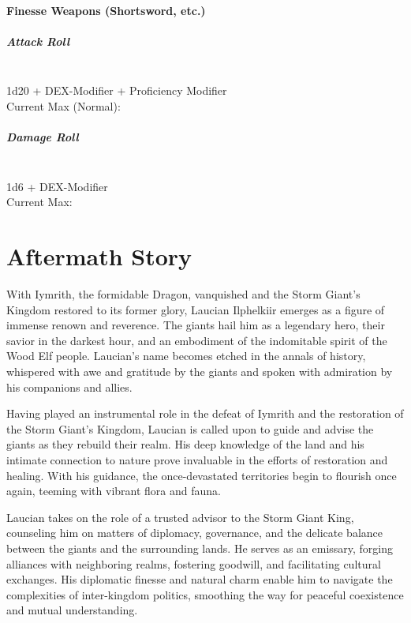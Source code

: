 \documentclass[letterpaper,openany,oneside,twocolumn]{book}
\begin{document}
\subsubsection*{Finesse Weapons (Shortsword, etc.)}
\paragraph*{Attack Roll}\hfill\\
1d20 + DEX-Modifier + Proficiency Modifier \\
\indent Current Max (Normal): 
\paragraph*{Damage Roll}\hfill\\
1d6 + DEX-Modifier \\
\indent Current Max: 

\chapter*{Aftermath Story}

\entryfont With Iymrith, the formidable Dragon, vanquished and the Storm Giant's Kingdom restored to its former glory, Laucian Ilphelkiir emerges as a figure of immense renown and reverence. The giants hail him as a legendary hero, their savior in the darkest hour, and an embodiment of the indomitable spirit of the Wood Elf people. Laucian's name becomes etched in the annals of history, whispered with awe and gratitude by the giants and spoken with admiration by his companions and allies.

Having played an instrumental role in the defeat of Iymrith and the restoration of the Storm Giant's Kingdom, Laucian is called upon to guide and advise the giants as they rebuild their realm. His deep knowledge of the land and his intimate connection to nature prove invaluable in the efforts of restoration and healing. With his guidance, the once-devastated territories begin to flourish once again, teeming with vibrant flora and fauna.

Laucian takes on the role of a trusted advisor to the Storm Giant King, counseling him on matters of diplomacy, governance, and the delicate balance between the giants and the surrounding lands. He serves as an emissary, forging alliances with neighboring realms, fostering goodwill, and facilitating cultural exchanges. His diplomatic finesse and natural charm enable him to navigate the complexities of inter-kingdom politics, smoothing the way for peaceful coexistence and mutual understanding.
\end{document}
